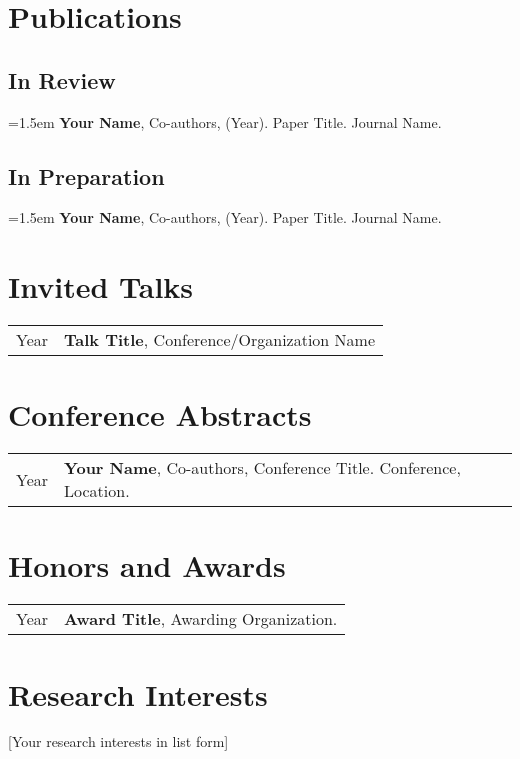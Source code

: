 \section{Publications}

    \subsection{In Review} 
    \hangindent=1.5em 
    \textbf{Your Name}, Co-authors, (Year). Paper Title. Journal Name.
    
    \subsection{In Preparation}
    \hangindent=1.5em 
    \textbf{Your Name}, Co-authors, (Year). Paper Title. Journal Name. 

\section{Invited Talks}
    \begin{tabularx}{\textwidth}{>{\raggedright\arraybackslash}p{1cm} X}
    Year & \textbf{Talk Title}, Conference/Organization Name \\
    \end{tabularx}

\section{Conference Abstracts}
    \begin{tabularx}{\textwidth}{>{\raggedright\arraybackslash}p{1cm} X}
    Year & \textbf{Your Name}, Co-authors, Conference Title. Conference, Location.
    \end{tabularx}

\section{Honors and Awards}
    \begin{tabularx}{\textwidth}{>{\raggedright\arraybackslash}p{1cm} X}
    Year & \textbf{Award Title}, Awarding Organization.
    \end{tabularx}

\section{Research Interests} %
    [Your research interests in list form]

